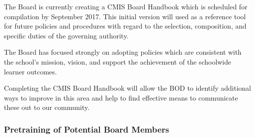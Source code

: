 \begin{findings}
The Board is currently creating a CMIS Board Handbook which is scheduled for compilation by September 2017. This initial version will used as a reference tool for future policies and procedures with regard to the selection, composition, and specific duties of the governing authority. 


The Board has focused strongly on adopting policies which are consistent with the school’s mission, vision, and support the achievement of the schoolwide learner outcomes.

Completing the CMIS Board Handbook will allow the BOD to identify additional ways to improve in this area and help to find effective means to communicate these out to our community.
\end{findings}

\subsubsection{Pretraining of Potential Board Members}



